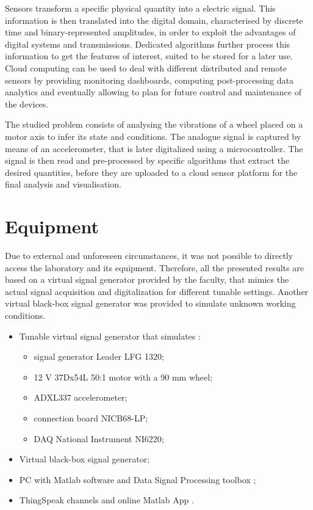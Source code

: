 \documentclass[12pt]{article}
\begin{document}
Sensors transform a specific physical quantity into a electric signal. This information is then translated into the digital domain, characterised by discrete time and binary-represented amplitudes, in order to exploit the advantages of digital systems and transmissions. Dedicated algorithms further process this information to get the features of interest, suited to be stored for a later use. Cloud computing can be used to deal with different distributed and remote sensors by providing monitoring dashboards, computing post-processing data analytics and eventually allowing to plan for future control and maintenance of the devices.

The studied problem consists of analysing the vibrations of a wheel placed on a motor axis to infer its state and conditions. The analogue signal is captured by means of an accelerometer, that is later digitalized using a microcontroller. The signal is then read and pre-processed by specific algorithms that extract the desired quantities, before they are uploaded to a cloud sensor platform for the final analysis and visualisation. 

\section{Equipment}	
Due to external and unforeseen circumstances, it was not possible to directly access the laboratory and its equipment. Therefore, all the presented results are based on a virtual signal generator provided by the faculty, that mimics the actual signal acquisition and digitalization for different tunable settings. Another virtual black-box signal generator was provided to simulate unknown working conditions.
\begin{itemize}
	\item Tunable virtual signal generator that simulates \cite{setup}:
		\begin{itemize}
			\item signal generator Leader LFG 1320;
			\item 12 V 37Dx54L 50:1 motor with a 90 mm wheel;
			\item ADXL337 accelerometer;
			\item connection board NICB68-LP;
			\item DAQ National Instrument NI6220;
		\end{itemize}
	\item Virtual black-box signal generator;
	\item PC with Matlab software and Data Signal Processing toolbox \cite{DSP};
	\item ThingSpeak channels and online Matlab App \cite{TS}.
\end{itemize}
\end{document}
